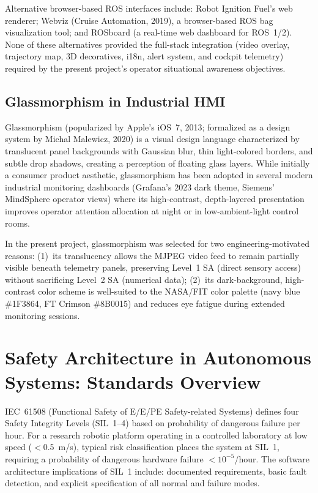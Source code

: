 Alternative browser-based ROS interfaces include: Robot Ignition Fuel's web renderer; Webviz (Cruise Automation, 2019), a browser-based ROS bag visualization tool; and ROSboard (a real-time web dashboard for ROS~1/2). None of these alternatives provided the full-stack integration (video overlay, trajectory map, 3D decoratives, i18n, alert system, and cockpit telemetry) required by the present project's operator situational awareness objectives.

\subsection{Glassmorphism in Industrial HMI}

Glassmorphism (popularized by Apple's iOS~7, 2013; formalized as a design system by Michal Malewicz, 2020) is a visual design language characterized by translucent panel backgrounds with Gaussian blur, thin light-colored borders, and subtle drop shadows, creating a perception of floating glass layers. While initially a consumer product aesthetic, glassmorphism has been adopted in several modern industrial monitoring dashboards (Grafana's 2023 dark theme, Siemens' MindSphere operator views) where its high-contrast, depth-layered presentation improves operator attention allocation at night or in low-ambient-light control rooms.

In the present project, glassmorphism was selected for two engineering-motivated reasons: (1)~its translucency allows the MJPEG video feed to remain partially visible beneath telemetry panels, preserving Level~1 SA (direct sensory access) without sacrificing Level~2 SA (numerical data); (2)~its dark-background, high-contrast color scheme is well-suited to the NASA/FIT color palette (navy blue \#1F3864, FT Crimson \#8B0015) and reduces eye fatigue during extended monitoring sessions.

\section{Safety Architecture in Autonomous Systems: Standards Overview}

IEC~61508 (Functional Safety of E/E/PE Safety-related Systems) defines four Safety Integrity Levels (SIL~1--4) based on probability of dangerous failure per hour. For a research robotic platform operating in a controlled laboratory at low speed ($<$0.5~m/s), typical risk classification places the system at SIL~1, requiring a probability of dangerous hardware failure $<10^{-5}$/hour. The software architecture implications of SIL~1 include: documented requirements, basic fault detection, and explicit specification of all normal and failure modes.

